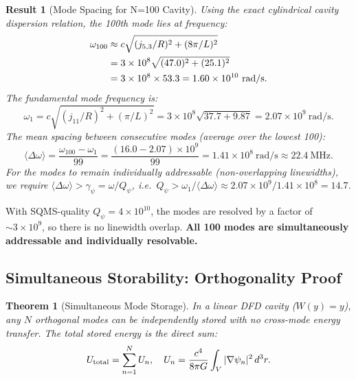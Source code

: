 \documentclass[aps,prd,twocolumn,superscriptaddress]{revtex4-2}
\newtheorem{theorem}{Theorem}
\newtheorem{result}{Result}
\begin{document}
\begin{result}[Mode Spacing for N=100 Cavity]
Using the exact cylindrical cavity dispersion relation, the 100th
mode lies at frequency:
\begin{align}
\omega_{100} &\approx c\sqrt{(j_{5,3}/R)^2 + (8\pi/L)^2} \notag\\
&= 3\times 10^8\sqrt{(47.0)^2 + (25.1)^2} \notag\\
&= 3\times 10^8\times 53.3 = 1.60\times 10^{10}~\mathrm{rad/s}.
\end{align}
The fundamental mode frequency is:
\begin{equation}
\omega_1 = c\sqrt{(j_{11}/R)^2 + (\pi/L)^2}
= 3\times 10^8\sqrt{37.7 + 9.87} = 2.07\times 10^9~\mathrm{rad/s}.
\end{equation}
The mean spacing between consecutive modes (average over the lowest 100):
\begin{equation}
\langle\Delta\omega\rangle = \frac{\omega_{100} - \omega_1}{99}
= \frac{(16.0 - 2.07)\times 10^9}{99}
= 1.41\times 10^8~\mathrm{rad/s} \approx 22.4~\mathrm{MHz}.
\end{equation}
For the modes to remain individually addressable (non-overlapping
linewidths), we require $\langle\Delta\omega\rangle > \gamma_\psi
= \omega/Q_\psi$, i.e.\ $Q_\psi > \omega_1/\langle\Delta\omega\rangle
\approx 2.07\times 10^9/1.41\times 10^8 = 14.7$.
\end{result}

With SQMS-quality $Q_\psi = 4\times 10^{10}$, the modes are
resolved by a factor of $\sim 3\times 10^9$, so there is no
linewidth overlap.  \textbf{All 100 modes are simultaneously addressable
and individually resolvable.}

\subsection{Simultaneous Storability: Orthogonality Proof}

\begin{theorem}[Simultaneous Mode Storage]
In a linear DFD cavity ($W(y) = y$), any $N$ orthogonal modes can be
independently stored with no cross-mode energy transfer.  The total
stored energy is the direct sum:
\begin{equation}
U_{\rm total} = \sum_{n=1}^{N} U_n,
\quad
U_n = \frac{c^4}{8\pi G}\int_V|\nabla\psi_n|^2\,d^3r.
\end{equation}
\end{theorem}
\end{document}
